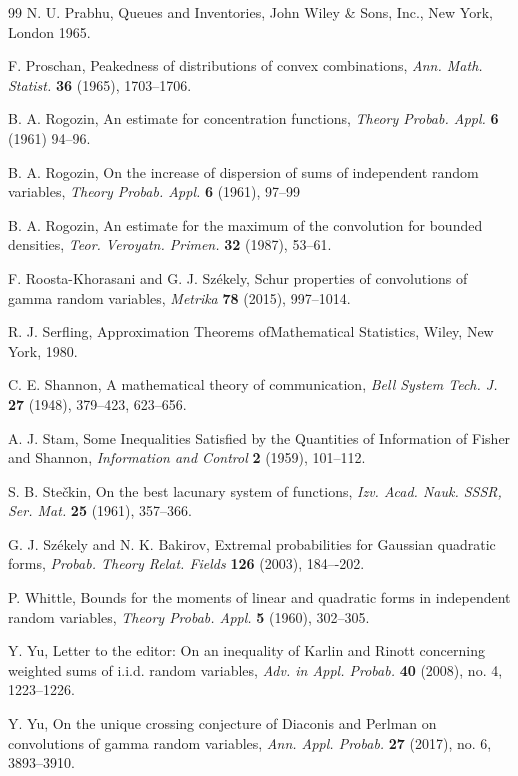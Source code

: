 \documentclass[11pt]{amsart}
\newcommand{\1}{\mathbf{1}}
\theoremstyle{definition}
\theoremstyle{definition}
\theoremstyle{remark}
\begin{document}
\begin{thebibliography}{99}
 N. U. Prabhu, Queues and Inventories, John Wiley \& Sons, Inc., New York, London 1965. 

 F. Proschan, Peakedness of distributions of convex combinations, \textit{Ann. Math. Statist.} \textbf{36} (1965), 1703--1706.

 B. A. Rogozin, An estimate for concentration functions, \textit{Theory Probab. Appl.}  \textbf{6} (1961) 94--96. %

 B. A. Rogozin, On the increase of dispersion of sums of independent random variables, \textit{Theory Probab. Appl.}  \textbf{6} (1961), 97--99 %

 B. A. Rogozin, An estimate for the maximum of the convolution for bounded densities, \textit{Teor. Veroyatn.
Primen.} \textbf{32} (1987), 53--61.

 F. Roosta-Khorasani and G. J. Sz\'ekely, Schur properties of convolutions of gamma random variables, \textit{Metrika} \textbf{78} (2015), 997--1014.

 R. J. Serfling, Approximation Theorems ofMathematical Statistics, Wiley, New York, 1980.

 C. E. Shannon, A mathematical theory of communication, \textit{Bell System Tech. J.} \textbf{27} (1948), 379--423, 623--656. 

 A. J. Stam, Some Inequalities Satisfied by the Quantities of Information of Fisher and Shannon, \textit{Information and Control} \textbf{2} (1959), 101--112. 

 S. B. Ste\v{c}kin, On the best lacunary system of functions, \textit{Izv. Acad. Nauk. SSSR, Ser. Mat.} \textbf{25} (1961), 357--366.

 G. J. Sz\'ekely and N. K. Bakirov, Extremal probabilities for Gaussian quadratic forms, \textit{Probab. Theory Relat. Fields} \textbf{126} (2003), 184–-202.

 P. Whittle, Bounds for the moments of linear and quadratic forms in independent random variables, \textit{Theory Probab. Appl.} \textbf{5} (1960), 302--305. 

 Y. Yu, Letter to the editor: On an inequality of Karlin and Rinott concerning weighted
sums of i.i.d. random variables, \textit{Adv. in Appl. Probab.} \textbf{40} (2008), no. 4, 1223--1226.

 Y. Yu, On the unique crossing conjecture of Diaconis and Perlman on convolutions of gamma random variables, \textit{Ann. Appl. Probab.} \textbf{27} (2017), no. 6, 3893--3910. 

\end{thebibliography}
\end{document}
